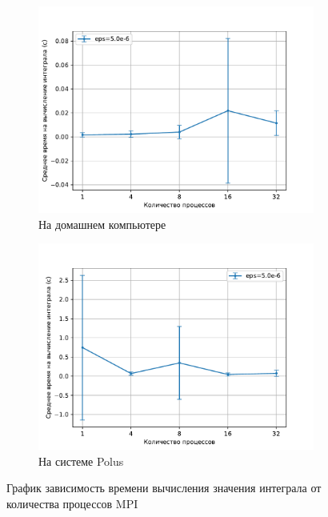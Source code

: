 \documentclass{article}
\begin{document}
\begin{figure}[!t]
\centering
\begin{subfigure}[b]{0.49\textwidth}
    \centering
    \includegraphics[width=\textwidth,trim=0 0 0 0,clip]{5.0e-6_home_pc_time.pdf}
    \caption{На домашнем компьютере}
    \label{img:2.1}
\end{subfigure}
\begin{subfigure}[b]{0.49\textwidth}
    \centering
    \includegraphics[width=\textwidth,trim=0 0 0 0,clip]{5.0e-6_polus_time.pdf}
    \caption{На системе Polus}
    \label{img:2.2}
\end{subfigure}
\caption{График зависимость времени вычисления значения интеграла  от количества процессов MPI}
\end{figure}
\end{document}
